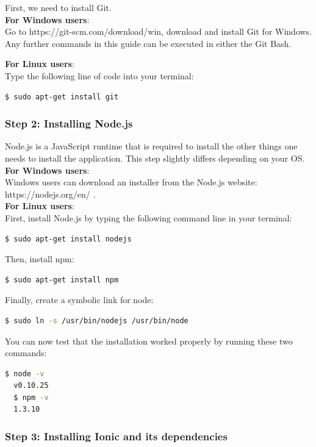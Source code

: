 \documentclass[11pt, a4paper]{report}
\begin{document}
First,  we need to install Git.\\

\textbf{For Windows users}: \\
Go to https://git-scm.com/download/win, download and install Git for Windows. Any further commands in this guide can be executed in either the Git Bash. 

\textbf{For Linux users}: \\
Type the following line of code into your terminal:
\begin{lstlisting}[language=bash]
  $ sudo apt-get install git
\end{lstlisting}


\subsubsection{Step 2: Installing Node.js}

Node.js is a JavaScript runtime that is required to install the other things one needs to install the application. This step slightly differs depending on your OS.\\

\textbf{For Windows users}: \\
Windows users can download an installer from the Node.js website: https://nodejs.org/en/ .\\

\textbf{For Linux users}: \\
First, install Node.js by typing the following command line in your terminal:
\begin{lstlisting}[language=bash]
  $ sudo apt-get install nodejs
\end{lstlisting}
Then, install npm:
\begin{lstlisting}[language=bash]
  $ sudo apt-get install npm
\end{lstlisting}
Finally, create a symbolic link for node:
\begin{lstlisting}[language=bash]
  $ sudo ln -s /usr/bin/nodejs /usr/bin/node
\end{lstlisting}
You can now test that the installation worked properly by running these two commands:
\begin{lstlisting}[language=bash]
  $ node -v
  v0.10.25
  $ npm -v
  1.3.10
\end{lstlisting}

\subsubsection{Step 3: Installing Ionic and its dependencies}
\end{document}
